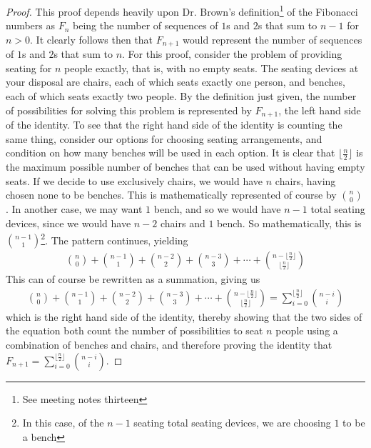 \documentclass[12pt]{article}
\begin{document}
\begin{proof}
This proof depends heavily upon Dr. Brown's definition\footnote[2]{See meeting notes thirteen} of the Fibonacci numbers as $F_n$ being the number of sequences of $1$s and $2$s that sum to $n-1$ for $n > 0$. It clearly follows then that $F_{n+1}$ would represent the number of sequences of $1$s and $2$s that sum to $n$. For this proof, consider the problem of providing seating for $n$ people exactly, that is, with no empty seats. The seating devices at your disposal are chairs, each of which seats exactly one person, and benches, each of which seats exactly two people. By the definition just given, the number of possibilities for solving this problem is represented by $F_{n+1}$, the left hand side of the identity. To see that the right hand side of the identity is counting the same thing, consider our options for choosing seating arrangements, and condition on how many benches will be used in each option. It is clear that $\lfloor \frac{n}{2} \rfloor$ is the maximum possible number of benches that can be used without having empty seats. If we decide to use exclusively chairs, we would have $n$ chairs, having chosen none to be benches. This is mathematically represented of course by $n \choose 0$. In another case, we may want $1$ bench, and so we would have $n-1$ total seating devices, since we would have $n-2$ chairs and $1$ bench. So mathematically, this is ${n-1}\choose 1$\footnote[3]{In this case, of the $n-1$ seating total seating devices, we are choosing $1$ to be a bench}. The pattern continues, yielding
\begin{eqnarray}
{n \choose 0} + {n-1\choose 1} + {n-2\choose 2} + {n-3\choose 3} + \cdots + {n -\lfloor \frac{n}{2} \rfloor\choose \lfloor \frac{n}{2} \rfloor} \nonumber
\end{eqnarray}
This can of course be rewritten as a summation, giving us
\begin{eqnarray}
{n \choose 0} + {n-1\choose 1} + {n-2\choose 2} + {n-3\choose 3} + \cdots + {n -\lfloor \frac{n}{2} \rfloor\choose \lfloor \frac{n}{2} \rfloor} = \sum_{i=0}^{\lfloor \frac{n}{2} \rfloor} {n-i \choose i} \nonumber
\end{eqnarray}
which is the right hand side of the identity, thereby showing that the two sides of the equation both count the number of possibilities to seat $n$ people using a combination of benches and chairs, and therefore proving the identity that $F_{n+1}= \sum_{i=0}^{\lfloor \frac{n}{2} \rfloor} \binom{n-i}{i}$.
\end{proof}
\end{document}
